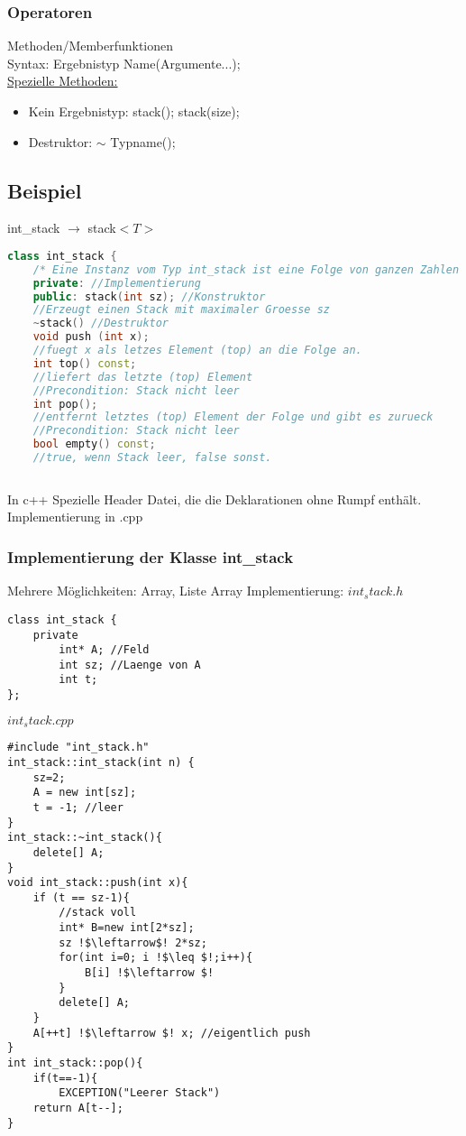 \documentclass[a4paper]{article}
\begin{document}
\subsubsection*{Operatoren}
Methoden/Memberfunktionen\\
Syntax: Ergebnistyp Name(Argumente...);\\
\underline{Spezielle Methoden:} 
\begin{itemize}
	\item Kein Ergebnistyp: stack(); stack(size);
	\item Destruktor: $\sim$ Typname();
\end{itemize}
\subsection{Beispiel}
int\_stack $\rightarrow$ stack$<T>$\\
\begin{lstlisting}[language=c++]
class int_stack {
	/* Eine Instanz vom Typ int_stack ist eine Folge von ganzen Zahlen (int). Eine Folge der laenge 0 heisst der leere Stack.*/
	private: //Implementierung
	public: stack(int sz); //Konstruktor
	//Erzeugt einen Stack mit maximaler Groesse sz
	~stack() //Destruktor
	void push (int x);
	//fuegt x als letzes Element (top) an die Folge an.
	int top() const;
	//liefert das letzte (top) Element
	//Precondition: Stack nicht leer
	int pop();
	//entfernt letztes (top) Element der Folge und gibt es zurueck
	//Precondition: Stack nicht leer
	bool empty() const;
	//true, wenn Stack leer, false sonst.
	
\end{lstlisting}
In c++ Spezielle Header Datei, die die Deklarationen ohne Rumpf enthält. Implementierung in .cpp\\
\subsubsection*{Implementierung der Klasse int\_stack}
Mehrere Möglichkeiten: Array, Liste
Array Implementierung:
$int_stack.h$
\begin{lstlisting}
class int_stack {
	private 
		int* A; //Feld
		int sz; //Laenge von A
		int t;
};
\end{lstlisting}
$int_stack.cpp$
\begin{lstlisting}[escapechar=!]
#include "int_stack.h"
int_stack::int_stack(int n) {
	sz=2;
	A = new int[sz];
	t = -1; //leer
}
int_stack::~int_stack(){
	delete[] A;
}
void int_stack::push(int x){
	if (t == sz-1){
		//stack voll
		int* B=new int[2*sz];
		sz !$\leftarrow$! 2*sz;
		for(int i=0; i !$\leq $!;i++){
			B[i] !$\leftarrow $!
		}
		delete[] A;
	}
	A[++t] !$\leftarrow $! x; //eigentlich push
}
int int_stack::pop(){
	if(t==-1){
		EXCEPTION("Leerer Stack")
	return A[t--];
}

\end{lstlisting}
\end{document}
